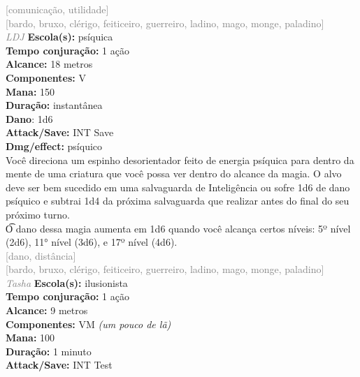 \documentclass{RPG_Adventure}[2021/10/20]
\begin{document}
{\scriptsize \textcolor{gray}{[comunicação, utilidade]\\}}
{\scriptsize \textcolor{gray}{[bardo, bruxo, clérigo, feiticeiro, guerreiro, ladino, mago, monge, paladino]\\}}
{\tiny \textcolor{gray}{\textit{LDJ}}}
{\small \t \textbf{Escola(s):} psíquica\\\t \textbf{Tempo conjuração:} 1 ação\\\t \textbf{Alcance:} 18 metros\\\t \textbf{Componentes:} V\\\t \textbf{Mana:} 150\\\t \textbf{Duração:} instantânea\\\t \textbf{Dano}: 1d6\\\t \textbf{Attack/Save:} INT Save\\\t \textbf{Dmg/effect:} psíquico\\}
{\normalsize Você direciona um espinho desorientador feito de energia psíquica para dentro da mente de uma criatura que você possa ver dentro do alcance da magia. O alvo deve ser bem sucedido em uma salvaguarda de Inteligência ou sofre 1d6 de dano psíquico e subtrai 1d4 da próxima salvaguarda que realizar antes do final do seu próximo turno.\\\t O dano dessa magia aumenta em 1d6 quando você alcança certos níveis: 5º nível (2d6), 11° nível (3d6), e 17º nível (4d6).\\}
{\scriptsize \textcolor{gray}{[dano, distância]\\}}
{\scriptsize \textcolor{gray}{[bardo, bruxo, clérigo, feiticeiro, guerreiro, ladino, mago, monge, paladino]\\}}
{\tiny \textcolor{gray}{\textit{Tasha}}}
{\small \t \textbf{Escola(s):} ilusionista\\\t \textbf{Tempo conjuração:} 1 ação\\\t \textbf{Alcance:} 9 metros\\\t \textbf{Componentes:} VM \textit{(um pouco de lã)}\\\t \textbf{Mana:} 100\\\t \textbf{Duração:} 1 minuto\\\t \textbf{Attack/Save:} INT Test\\}
\end{document}
